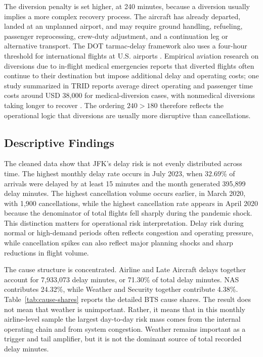 \documentclass[11pt]{article}
\numberwithin{figure}{section}
\numberwithin{table}{section}
\begin{document}
The diversion penalty is set higher, at 240 minutes, because a diversion usually implies a more complex recovery process. The aircraft has already departed, landed at an unplanned airport, and may require ground handling, refueling, passenger reprocessing, crew-duty adjustment, and a continuation leg or alternative transport. The DOT tarmac-delay framework also uses a four-hour threshold for international flights at U.S. airports \cite{dot2025tarmac}. Empirical aviation research on diversions due to in-flight medical emergencies reports that diverted flights often continue to their destination but impose additional delay and operating costs; one study summarized in TRID reports average direct operating and passenger time costs around USD 38,000 for medical-diversion cases, with nonmedical diversions taking longer to recover \cite{lewis2021diversions}. The ordering \(240 > 180\) therefore reflects the operational logic that diversions are usually more disruptive than cancellations.

\subsection{Descriptive Findings}

The cleaned data show that JFK's delay risk is not evenly distributed across time. The highest monthly delay rate occurs in July 2023, when 32.69\% of arrivals were delayed by at least 15 minutes and the month generated 395,899 delay minutes. The highest cancellation volume occurs earlier, in March 2020, with 1,900 cancellations, while the highest cancellation rate appears in April 2020 because the denominator of total flights fell sharply during the pandemic shock. This distinction matters for operational risk interpretation. Delay risk during normal or high-demand periods often reflects congestion and operating pressure, while cancellation spikes can also reflect major planning shocks and sharp reductions in flight volume.

The cause structure is concentrated. Airline and Late Aircraft delays together account for 7,933,073 delay minutes, or 71.30\% of total delay minutes. NAS contributes 24.32\%, while Weather and Security together contribute 4.38\%. Table~\ref{tab:cause-shares} reports the detailed BTS cause shares. The result does not mean that weather is unimportant. Rather, it means that in this monthly airline-level sample the largest day-to-day risk mass comes from the internal operating chain and from system congestion. Weather remains important as a trigger and tail amplifier, but it is not the dominant source of total recorded delay minutes.
\end{document}
